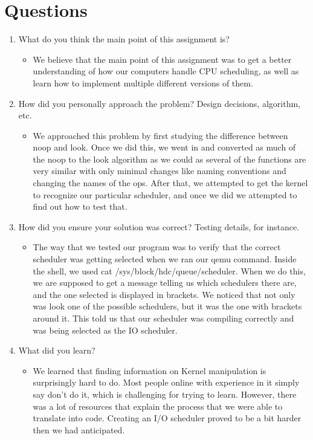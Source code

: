 \documentclass[journal,10pt,onecolumn,compsoc]{IEEEtran} \usepackage[margin=1.0in]{geometry} \usepackage{pdfpages}
\begin{document}
\section {Questions}
\begin {enumerate}
\item What do you think the main point of this assignment is?
	\begin{itemize}
    	\item We believe that the main point of this assignment was to get a better understanding of how our computers handle CPU scheduling, as well as learn how to implement multiple different versions of them.
    \end{itemize}
\item How did you personally approach the problem? Design decisions, algorithm, etc.
	\begin{itemize}
    	\item We approached this problem by first studying the difference between noop and look. Once we did this, we went in and converted as much of the noop to the look algorithm as we could as several of the functions are very similar with only minimal changes like naming conventions and changing the names of the ops. After that, we attempted to get the kernel to recognize our particular scheduler, and once we did we attempted to find out how to test that.
    \end{itemize}
\item How did you ensure your solution was correct? Testing details, for instance.
	\begin{itemize}
    	\item The way that we tested our program was to verify that the correct scheduler was getting selected when we ran our qemu command. Inside the shell, we used cat /sys/block/hdc/queue/scheduler. When we do this, we are supposed to get a message telling us which schedulers there are, and the one selected is displayed in brackets. We noticed that not only was look one of the possible schedulers, but it was the one with brackets around it. This told us that our scheduler was compiling correctly and was being selected as the IO scheduler. 
    \end{itemize}
\item What did you learn?
	\begin{itemize}
    	\item We learned that finding information on Kernel manipulation is surprisingly hard to do. Most people online with experience in it simply say don't do it, which is challenging for trying to learn. However, there was a lot of resources that explain the process that we were able to translate into code. Creating an I/O scheduler proved to be a bit harder then we had anticipated.  

\end{itemize}
\end{enumerate}
\end{document}
